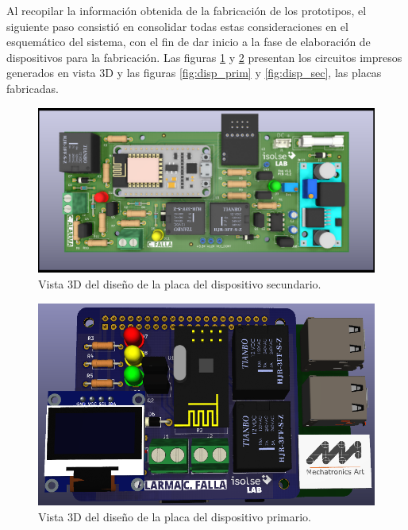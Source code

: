 Al recopilar la información obtenida de la fabricación de los prototipos, el siguiente paso consistió en consolidar todas estas consideraciones en el esquemático del sistema, con el fin de dar inicio a la fase de elaboración de dispositivos para la fabricación. Las figuras \ref{fig:figura_h} y \ref{fig:figura_i} presentan los circuitos impresos generados en vista 3D y las figuras \ref{fig:disp_prim} y \ref{fig:disp_sec}, las placas fabricadas.

\begin{figure}[ht]
	\centering
	\includegraphics[scale=.25]{./Figures/Capitulo4/Figura_H.png}
	\caption{Vista 3D del diseño de la placa del dispositivo secundario.}
	\label{fig:figura_h}
\end{figure}

\begin{figure}[ht]
	\centering
	\includegraphics[scale=.3]{./Figures/Capitulo4/Figura_I.png}
	\caption{Vista 3D del diseño de la placa del dispositivo primario.}
	\label{fig:figura_i}
\end{figure}

